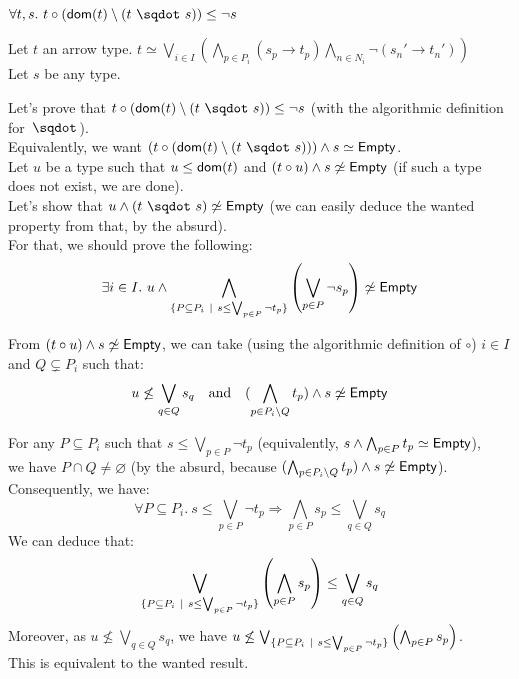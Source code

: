 \documentclass[a4paper]{article}%
\begin{document}
    \begin{lemma}
        $\forall t, s.\ \apply t {(\dom t \setminus (\worra t s))} \leq \neg s$
    \end{lemma}
    
    Let $t$ an arrow type. $t \simeq \bigvee_{i\in I}\left(\bigwedge_{p\in P_i}(s_p\to t_p)\bigwedge_{n\in N_i}\neg(s_n'\to t_n')\right)$\\
    Let $s$ be any type.

    Let's prove that $\apply t {(\dom t \setminus (\worra t s))} \leq \neg s$ (with the algorithmic definition for $\worra {} {}$).\\
    Equivalently, we want $(\apply t {(\dom t \setminus (\worra t s))}) \land s \simeq \Empty$.\\

    Let $u$ be a type such that $u \leq \textsf{dom}(t)$ and $(t\circ u) \land s \not\simeq \textsf{Empty}$ (if such a type does not exist, we are done).\\
    Let's show that $u \land (\worra t s) \not\simeq \Empty$ (we can easily deduce the wanted property from that, by the absurd).\\
    For that, we should prove the following:\\

    \[
        \exists i \in I.\ 
        u \land \bigwedge_{\{P \subseteq P_i\alt s \leq \bigvee_{p \in P} \neg t_p\}} \left(\bigvee_{p \in P} \neg s_p \right) \not\simeq \Empty
    \]

  From $(t\circ u) \land s \not\simeq \textsf{Empty}$, we can take (using the algorithmic definition of $\circ$) $i \in I$ and $Q \subsetneq P_i$ such that:\\
  \[ u \not\leq\bigvee_{q\in Q}s_q \text{\ \ \ and\ \ \ } (\bigwedge_{p\in P_i\setminus Q}t_p) \land s \not\simeq \Empty \]

    For any $P \subseteq P_i$ such that $s \leq \bigvee_{p \in P} \neg t_p$ (equivalently, $s \land \bigwedge_{p \in P} t_p \simeq \textsf{Empty}$),\\
    we have $P \cap Q \neq \varnothing$ (by the absurd, because $(\bigwedge_{p\in P_i\setminus Q}t_p) \land s \not\simeq \textsf{Empty}$).\\
    Consequently, we have:
    \[ \forall P \subseteq P_i.\ s \leq \bigvee_{p \in P} \neg t_p \Rightarrow \bigwedge_{p \in P} s_p \leq \bigvee_{q \in Q}s_q \]
    We can deduce that:
    \[ \bigvee_{\{P \subseteq P_i~|~ s \leq \bigvee_{p \in P} \neg t_p\}} \left(\bigwedge_{p \in P} s_p\right) \leq \bigvee_{q \in Q}s_q \]
    Moreover, as $u \not\leq \bigvee_{q\in Q}s_q$, we have $u \not\leq \bigvee_{\{P \subseteq P_i~|~ s \leq \bigvee_{p \in P} \neg t_p\}} \left(\bigwedge_{p \in P} s_p\right)$.\\
    This is equivalent to the wanted result.
        
\end{document}
